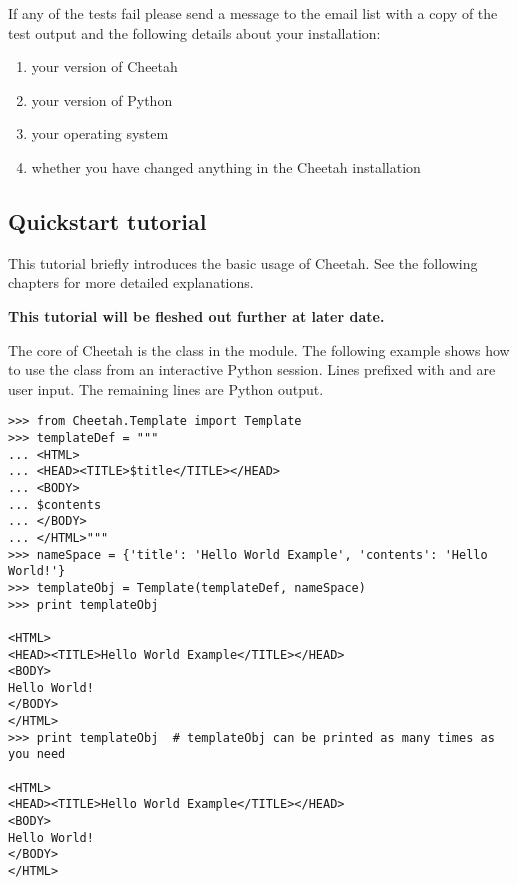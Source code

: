 If any of the tests fail please send a message to the email list with a copy of
the test output and the following details about your installation:

\begin{enumerate}
\item your version of Cheetah
\item your version of Python
\item your operating system
\item whether you have changed anything in the Cheetah installation
\end{enumerate}

\subsection{Quickstart tutorial}
This tutorial briefly introduces the basic usage of Cheetah.  See the
following chapters for more detailed explanations.  

{\bf This tutorial will be fleshed out further at later date.} 

The core of Cheetah is the  class in the 
module. The following example shows how to use the  class from an
interactive Python session. Lines prefixed with \code{>>>} and  are
user input.  The remaining lines are Python output.

\begin{verbatim}
>>> from Cheetah.Template import Template
>>> templateDef = """
... <HTML>
... <HEAD><TITLE>$title</TITLE></HEAD>
... <BODY>
... $contents
... </BODY>
... </HTML>"""
>>> nameSpace = {'title': 'Hello World Example', 'contents': 'Hello World!'}
>>> templateObj = Template(templateDef, nameSpace)
>>> print templateObj
 
<HTML>
<HEAD><TITLE>Hello World Example</TITLE></HEAD>
<BODY>
Hello World!
</BODY>
</HTML>
>>> print templateObj  # templateObj can be printed as many times as you need
 
<HTML>
<HEAD><TITLE>Hello World Example</TITLE></HEAD>
<BODY>
Hello World!
</BODY>
</HTML>

\end{verbatim}


